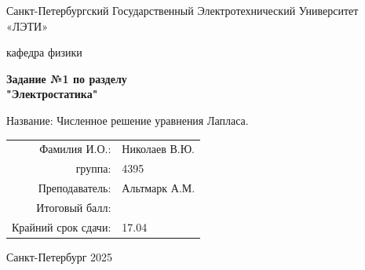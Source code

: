 \documentclass[12pt]{article}
\begin{document}
\begin{titlepage}
\centering
{\large Санкт-Петербургский Государственный Электротехнический Университет «ЛЭТИ»\par}
\vspace{1.5cm}
{\large кафедра физики\par}
\vspace{3cm}
{\LARGE \textbf{Задание №1 по разделу \\ "Электростатика"}\par}
\vspace{1cm}
{\Large Название: Численное решение уравнения Лапласа.\par}
\vspace{3cm}
\begin{flushright}
    \begin{tabular}{@{}r@{\quad}l@{}}
        Фамилия И.О.: & Николаев В.Ю.\\[0.5cm]
        группа: & 4395\\[0.5cm]
        Преподаватель: & Альтмарк А.М. \\[0.5cm]
        Итоговый балл: & \\[0.5cm]
        Крайний срок сдачи: & 17.04 \\[0.5cm]
    \end{tabular}
\end{flushright}
\vfill
{\Large Санкт-Петербург 2025\par}
\end{titlepage}
    

\end{document}
